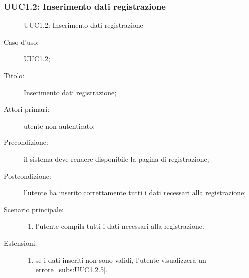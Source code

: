 \documentclass[../../../analisi-dei-requisiti.tex]{subfiles}
\begin{document}
\subsubsection{UUC1.2: Inserimento dati registrazione}%
\label{subs:UUC1.2}

\begin{figure}[H]
  \centering
  \caption{UUC1.2: Inserimento dati registrazione}%
  \label{fig:uuc1_2}
\end{figure}

\begin{description}
  \item[Caso d’uso:] UUC1.2;
  \item[Titolo:] Inserimento dati registrazione;
  \item[Attori primari:] utente non autenticato;
  \item[Precondizione:] il sistema deve rendere disponibile la pagina di registrazione;
  \item[Postcondizione:] l'utente ha inserito correttamente tutti i dati necessari alla registrazione;
  \item[Scenario principale:]
        \begin{enumerate}
          \item l'utente compila tutti i dati necessari alla registrazione.
        \end{enumerate}
  \item[Estensioni:]
        \begin{enumerate}
          \item se i dati inseriti non sono validi, l'utente visualizzerà un errore~\ref{subs:UUC1.2.5}.
        \end{enumerate}
\end{description}
\end{document}
